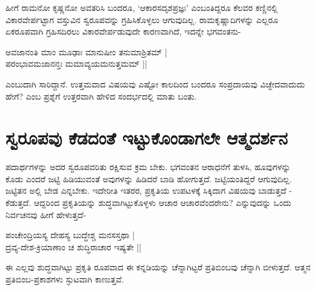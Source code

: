 ಹೀಗೆ ರಾಮನೋ ಕೃಷ್ಣನೋ ಅವತರಿಸಿ ಬಂದರೂ, `ಆಕಾರಸದೃಶಪ್ರಜ್ಞಃ'\label{139} ಎಂಬಂತಿದ್ದರೂ ಕೆಲವರ ಕಣ್ಣಿನಲ್ಲಿ ವಿಕಾರವೇರ್ಪಟ್ಟಾಗ ವಸ್ತುವಿನ ಸ್ವರೂಪವನ್ನು ಗ್ರಹಿಸಿಕೊಳ್ಳಲು ಆಗುವುದಿಲ್ಲ. ರಾಮಕೃಷ್ಣಾದಿಗಳನ್ನು ಎಲ್ಲರೂ ಏಕರೂಪವಾಗಿ ಗ್ರಹಿಸದಿರಲು ವಿಕಾರವೇರ್ಪಡುವುದೇ ಕಾರಣವಾಗಿದೆ, ಇದನ್ನೇ ಭಗವಂತನು-

\begin{shloka}
ಅವಜಾನಂತಿ ಮಾಂ ಮೂಢಾಃ ಮಾನುಷೀಂ ತನುಮಾಶ್ರಿತಮ್ |\label{139}\\
ಪರಂಭಾವಮಜಾನನ್ತಃ ಮಮಾವ್ಯಯಮನುತ್ತಮಮ್ ||
\end{shloka}

ಎಂಬುದಾಗಿ ಸಾರಿದ್ದಾನೆ. ಉತ್ತಮವಾದ ವಿಷಯವು ಎಷ್ಟೋ ಕಾಲದಿಂದ ಬಂದರೂ ಸಂಪ್ರದಾಯವು ವಿಚ್ಛೇದವಾದುದು ಹೇಗೆ? ಎಂಬ ಪ್ರಶ್ನೆಗೆ ಉತ್ತರವಾಗಿ ಹೇಳಿದ ಸಂದರ್ಭದಲ್ಲಿ ಮಾತು ಬಂತು.

\section*{ಸ್ವರೂಪವು ಕೆಡದಂತೆ ಇಟ್ಟುಕೊಂಡಾಗಲೇ ಆತ್ಮದರ್ಶನ}

ಪದಾರ್ಥಗಳನ್ನು ಅದರ ಸ್ವರೂಪವರಿತು ರಕ್ಷಿಸುವ ಕ್ರಮ ಬೇಕು. ಭಗವಂತನ ಆರಾಧನೆಗೆ ತುಳಸಿ, ಹೂವುಗಳನ್ನು ಕೊಡು ಎಂದರೆ ಜಟ್ಟಿ ಹಿಡಿಯುವಂತೆ ಅವುಗಳನ್ನು ಹಿಡಿದರೆ ಬಾಡಿ ಹೋಗುತ್ತದೆ. ಜಟ್ಟಿಯಂತಿದ್ದರೆ ಆಗುವುದಿಲ್ಲ. ಜಟ್ಟಿತನ ಅಲ್ಲಿ ಬೇಡ ಎನ್ನಬೇಕು. ಇದೇರೀತಿ ಇತರರ, ಪ್ರಕೃತಿಯ ಉಪಟಳಕ್ಕೆ ಸಿಕ್ಕಿದಾಗ ವಿಷಯವು ಬಾಡುತ್ತದೆ - ಕೆಡುತ್ತದೆ. ಆದ್ದರಿಂದ ಪ್ರಕೃತಿಯನ್ನು ಶುದ್ಧವಾಗಿಟ್ಟುಕೊಳ್ಳಳು ಆಚಾರ ಆಚಾರವೆಂದರೇನು? ಎನ್ನುವುದನ್ನು ಒಂದು ನಿರ್ವಚನವು ಹೀಗೆ ಹೇಳುತ್ತದೆ-

\begin{shloka}
ಪಂಚೇಂದ್ರಿಯಸ್ಯ ದೇಹಸ್ಯ ಬುದ್ಧೇಶ್ಚ ಮನಸಸ್ತಥಾ |\label{139}\\
ದ್ರವ್ಯ-ದೇಶ-ಕ್ರಿಯಾಣಾಂ ಚ ಶುದ್ಧಿರಾಚಾರ ಇಷ್ಯತೇ ||
\end{shloka}

ಈ ಎಲ್ಲವು ಶುದ್ಧವಾಗಿಟ್ಟು ಪ್ರಕೃತಿ ರೂಪವಾದ ಈ ಕನ್ನಡಿಯನ್ನು ಚೆನ್ನಾಗಿಟ್ಟರೆ ಪ್ರತಿಬಿಂಬವು ಚೆನ್ನಾಗಿ ಬೀಳುತ್ತದೆ. ಆತ್ಮನ ಪ್ರತಿಬಿಂಬ-ಪ್ರಕಾಶಗಳು ಸ್ಫುಟವಾಗಿ ಕಾಣುತ್ತವೆ.

